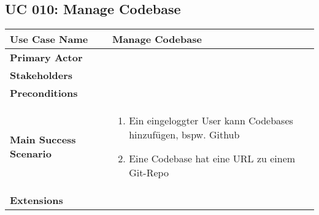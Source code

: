 \subsection{UC 010: Manage Codebase}
\label{uc:010-manage-codebase}

\begin{tabular}{|l|p{}|}
\hline
\textbf{Use Case Name} 	&	Manage Codebase	\\ \hline
\textbf{Primary Actor} 	&		\\ \hline
\textbf{Stakeholders}	&		\\ \hline
\textbf{Preconditions}	&		\\ \hline
\textbf{Main Success Scenario}	&
\begin{enumerate}
	\item Ein eingeloggter User kann Codebases hinzufügen, bspw. Github
	\item Eine Codebase hat eine URL zu einem Git-Repo
\end{enumerate}
\\ \hline
\textbf{Extensions}	& 	\\ \hline
\end{tabular}